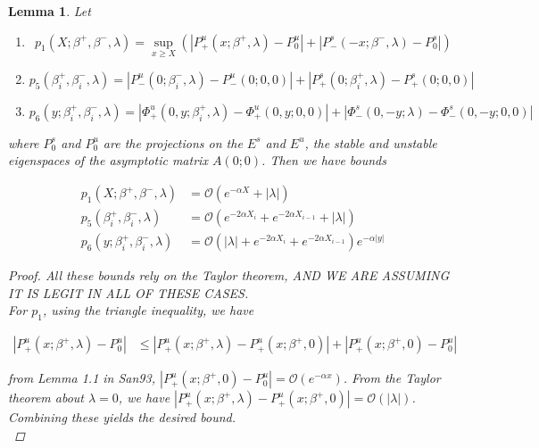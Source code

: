 \documentclass[12pt]{article}
\newtheorem{lemma}{Lemma}
\begin{document}
\begin{lemma}\label{projbounds}
Let

\begin{enumerate}
\item
\begin{equation}\label{p1}
p_1(X; \beta^+, \beta^-, \lambda) = \sup_{x \geq X} (|P^u_+(x; \beta^+, \lambda) - P_0^u| + |P^s_-(-x; \beta^-, \lambda) - P_0^s|)
\end{equation}
\item
\begin{equation}\label{p5}
p_5(\beta_i^+, \beta_i^-, \lambda) = |P^u_-(0; \beta_i^-, \lambda) - P^u_-(0; 0, 0)| + |P^s_+(0; \beta_i^+, \lambda) - P^s_+(0; 0, 0)|
\end{equation}
\item 
\begin{equation}\label{p6}
p_6(y; \beta_i^+, \beta_i^-, \lambda) = |\Phi^u_+(0, y; \beta_i^+, \lambda) - \Phi^u_+(0, y; 0, 0)| + |\Phi^s_-(0, -y; \lambda) - \Phi^s_-(0, -y; 0, 0)| 
\end{equation}

\end{enumerate}

where $P_0^s$ and $P_0^u$ are the projections on the $E^s$ and $E^u$, the stable and unstable eigenspaces of the asymptotic matrix $A(0; 0)$. Then we have bounds

\begin{align}
p_1(X; \beta^+, \beta^-, \lambda) &= \mathcal{O}( e^{-\alpha X } + |\lambda| ) \\
p_5(\beta_i^+, \beta_i^-, \lambda) &= \mathcal{O}(e^{-2 \alpha X_i} + e^{-2 \alpha X_{i-1}} + |\lambda|) \\
p_6(y; \beta_i^+, \beta_i^-, \lambda) &= \mathcal{O}(|\lambda| + e^{-2 \alpha X_i} + e^{-2 \alpha X_{i-1}} ) e^{-\alpha |y|}
\end{align}

\begin{proof}
All these bounds rely on the Taylor theorem, AND WE ARE ASSUMING IT IS LEGIT IN ALL OF THESE CASES.\\

For $p_1$, using the triangle inequality, we have

\begin{align*}
|P^u_+(x; \beta^+, \lambda) - P_0^u| 
&\leq |P^u_+(x; \beta^+, \lambda) - P^u_+(x; \beta^+, 0)| + |P^u_+(x; \beta^+, 0) - P_0^u| 
\end{align*}

from Lemma 1.1 in San93, $|P^u_+(x; \beta^+, 0) - P_0^u| = \mathcal{O}(e^{-\alpha x})$. From the Taylor theorem about $\lambda = 0$, we have $|P^u_+(x; \beta^+, \lambda) - P^u_+(x; \beta^+, 0)| = \mathcal{O}(|\lambda|)$. Combining these yields the desired bound.\\


\end{proof}
\end{lemma}
\end{document}
